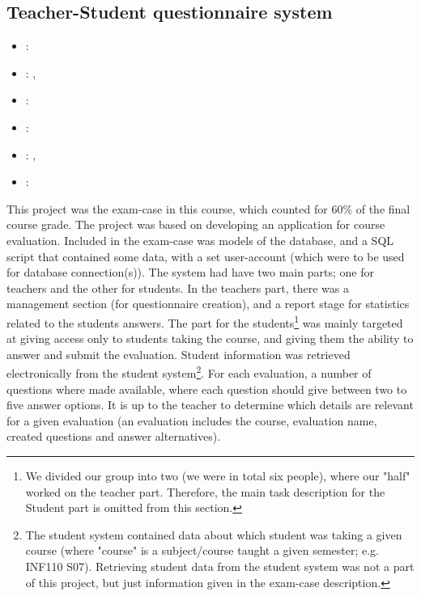 \subsection{Teacher-Student questionnaire system}
\label{sec:inf116_teacher_system}
\begin{itemize} 
	\item {}: 
	\item {}: , 
	\item {}: 
	\item {}: 
	\item {}: , 
	\item {}: 
\end{itemize} 
This project was the exam-case in this course, which counted for 60\% of the final course grade. 
The project was  based on developing an application for course evaluation.
Included in the exam-case was models of the database, and a SQL script that contained some data, with a set user-account (which were to be used for database connection(s)).
The system had have two main parts; one for teachers and the other for students. 
In the teachers part, there was a management section (for questionnaire creation), and a report stage for statistics related to the students answers.
The part for the students\footnote{
	We divided our group into two (we were in total six people), where our "half" worked on the teacher part. 
	Therefore, the main task description for the Student part is omitted from this section.
} was mainly targeted at giving access only to students taking the course, and giving them the ability to answer and submit the evaluation.
Student information was retrieved electronically from the student system\footnote{
	The student system contained data about which student was taking a given course (where "course" is a subject/course taught a given semester; e.g. INF110 S07).
	Retrieving student data from the student system was not a part of this project, but just information given in the exam-case description.
}.
\vspace{0.5em}\newline
For each evaluation, a number of questions where made available, where each question should give between two to five answer options.
It is up to the teacher to determine which details are relevant for a given evaluation (an evaluation includes the course, evaluation name, created questions and answer alternatives).
